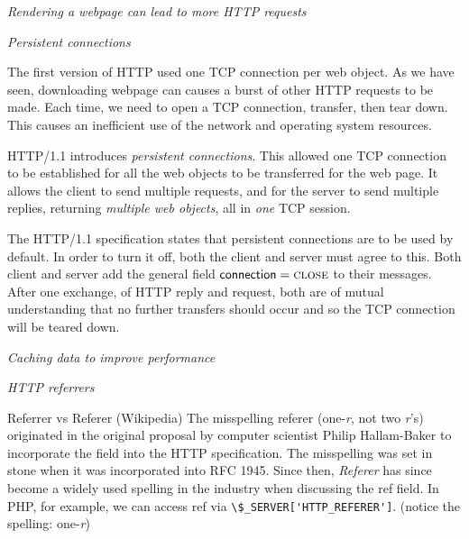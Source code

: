 \frmrule 

\textit{Rendering a webpage can lead to more HTTP requests}

\frmrule 


\textit{Persistent connections}

The first version of HTTP used one TCP connection per web object. 
As we have seen, downloading webpage can causes a burst 
of other HTTP requests to be made. Each time, we need 
to open a TCP connection, transfer, then tear down. 
This causes an inefficient use of the network and operating system resources. 

HTTP/1.1 introduces \textit{persistent connections}. 
This allowed one TCP connection to be established for all 
the web objects to be transferred for the web page.
It allows the client to send multiple requests, and for the server to 
send multiple replies, returning \textit{multiple web objects}, 
all in \textit{one} TCP session. 


The HTTP/1.1 specification states that persistent connections 
are to be used by default. In order to turn it off, 
both the client and server must agree to this. 
Both client and server add the general field
$\mathsf{connection} = \textsc{close}$ to their messages.
After one exchange, of HTTP reply and request, both are 
of mutual understanding that no further transfers should 
occur and so the TCP connection will be teared down. 

\frmrule 

\textit{Caching data to improve performance}

\frmrule 

\textit{HTTP referrers}


\begin{sidenote}{Referrer vs Referer}
(Wikipedia)
The misspelling referer (one-\textit{r}, not two \textit{r}'s) originated in 
the original proposal by computer scientist Philip Hallam-Baker to incorporate 
the field into the HTTP specification. 
The misspelling was set in stone when it was incorporated into RFC 1945.  Since 
then, \textit{Referer} has since become a widely used spelling in the industry when discussing 
the \textsf{ref} field. 
In PHP, for example, we can access \textsf{ref} via \lstinline{\$_SERVER['HTTP_REFERER']}. (notice 
the spelling: one-\textit{r})
\end{sidenote}

